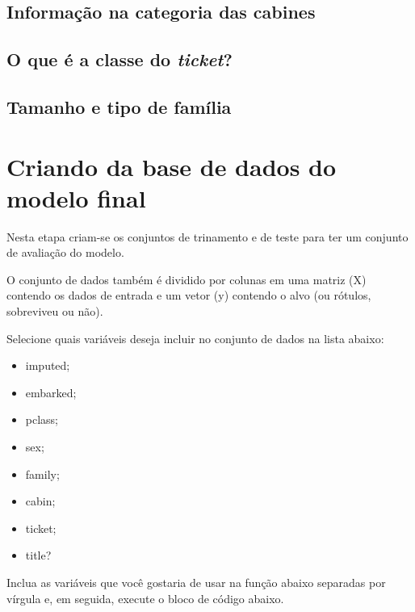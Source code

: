 \documentclass[a4paper,12pt]{report}
\begin{document}
\subsection{Informação na categoria das cabines}



\subsection{O que é a classe do \textit{ticket}?}



\subsection{Tamanho e tipo de família}



\section{Criando da base de dados do modelo final}

Nesta etapa criam-se os conjuntos de trinamento e de teste para ter um conjunto de avaliação do modelo.

O conjunto de dados também é dividido por colunas em uma matriz (X) contendo os dados de entrada e um vetor (y) contendo o alvo (ou rótulos, sobreviveu ou não).

Selecione quais variáveis deseja incluir no conjunto de dados na lista abaixo:

\begin{itemize} [noitemsep,topsep=0pt]
	\item imputed;
	\item embarked;
	\item pclass;
	\item sex;
	\item family;
	\item cabin;
	\item ticket;
	\item title?
\end{itemize}

Inclua as variáveis que você gostaria de usar na função abaixo separadas por vírgula e, em seguida, execute o bloco de código abaixo. \\
\end{document}
